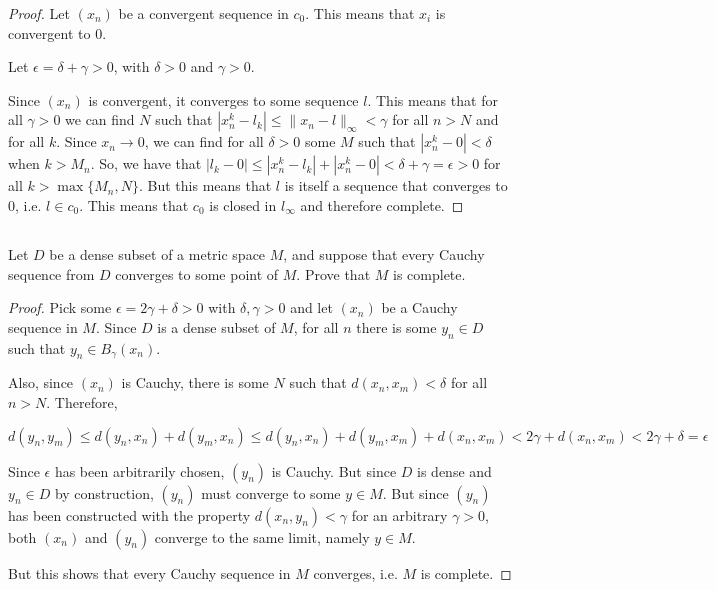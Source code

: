 \begin{proof}
Let $(x_n)$ be a convergent sequence in $c_0$. This means that $x_i$ is convergent to 0.

Let $\epsilon = \delta + \gamma > 0$, with $\delta > 0$ and $\gamma > 0$.

Since $(x_n)$ is convergent, it converges to some sequence $l$. This means that for all $\gamma > 0$ we can find $N$ such that $|x_n^k - l_k| \leq \|x_n - l\|_\infty < \gamma$ for all $n>N$ and for all $k$. Since $x_n \rightarrow 0$, we can find for all $\delta > 0$ some $M$ such that $|x_n^k - 0| < \delta$ when $k>M_n$. So, we have that $|l_k - 0| \leq |x_n^k - l_k| + |x_n^k - 0| < \delta + \gamma = \epsilon > 0$ for all $k > \max\{M_n, N\}$. But this means that $l$ is itself a sequence that converges to 0, i.e. $l \in c_0$. This means that $c_0$ is closed in $l_\infty$ and therefore complete.
\end{proof}


\subsection{} Let $D$ be a dense subset of a metric space $M$, and suppose that every Cauchy sequence from $D$ converges to some point of $M$. Prove that $M$ is complete. 

\begin{proof}
Pick some $\epsilon = 2\gamma + \delta > 0$ with $\delta, \gamma > 0$ and let $(x_n)$ be a Cauchy sequence in $M$. Since $D$ is a dense subset of $M$, for all $n$ there is some $y_n \in D$ such that $y_n \in B_\gamma(x_n)$.

Also, since $(x_n)$ is Cauchy, there is some $N$ such that $d(x_n, x_m) < \delta$ for all $n>N$.  Therefore,

$$d(y_n, y_m) \leq d(y_n, x_n) + d(y_m, x_n) \leq d(y_n, x_n) + d(y_m, x_m) + d(x_n, x_m) < 2\gamma + d(x_n, x_m) < 2\gamma + \delta = \epsilon$$

Since $\epsilon$ has been arbitrarily chosen, $(y_n)$ is Cauchy. But since $D$ is dense and $y_n \in D$ by construction, $(y_n)$ must converge to some $y \in M$. But since $(y_n)$ has been constructed with the property $d(x_n, y_n) < \gamma$ for an arbitrary $\gamma > 0$, both $(x_n)$ and $(y_n)$ converge to the same limit, namely $y \in M$.

But this shows that every Cauchy sequence in $M$ converges, i.e. $M$ is complete.
\end{proof}

